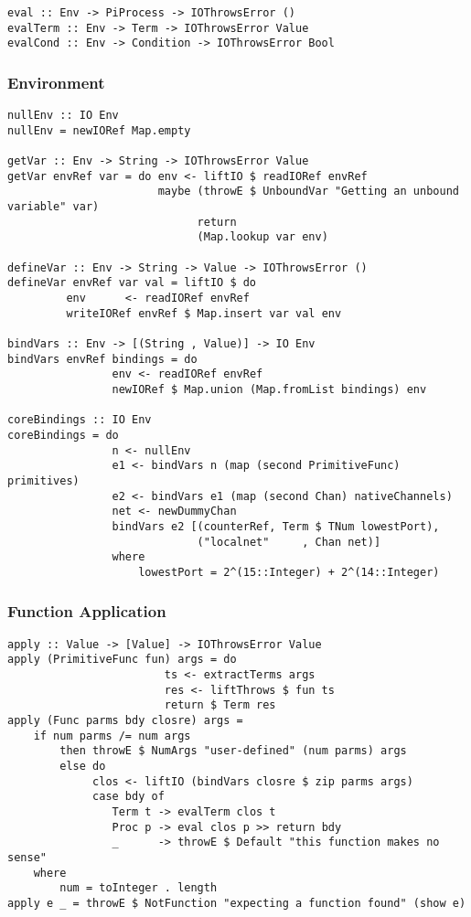 \begin{verbatim}
eval :: Env -> PiProcess -> IOThrowsError () 
evalTerm :: Env -> Term -> IOThrowsError Value
evalCond :: Env -> Condition -> IOThrowsError Bool
\end{verbatim}

\subsubsection{Environment}

\begin{verbatim}
nullEnv :: IO Env
nullEnv = newIORef Map.empty

getVar :: Env -> String -> IOThrowsError Value 
getVar envRef var = do env <- liftIO $ readIORef envRef
                       maybe (throwE $ UnboundVar "Getting an unbound variable" var)
                             return
                             (Map.lookup var env)
                           
defineVar :: Env -> String -> Value -> IOThrowsError ()
defineVar envRef var val = liftIO $ do
         env      <- readIORef envRef
         writeIORef envRef $ Map.insert var val env

bindVars :: Env -> [(String , Value)] -> IO Env
bindVars envRef bindings = do
                env <- readIORef envRef
                newIORef $ Map.union (Map.fromList bindings) env

coreBindings :: IO Env
coreBindings = do
                n <- nullEnv 
                e1 <- bindVars n (map (second PrimitiveFunc) primitives) 
                e2 <- bindVars e1 (map (second Chan) nativeChannels)
                net <- newDummyChan
                bindVars e2 [(counterRef, Term $ TNum lowestPort),
                             ("localnet"     , Chan net)]
                where 
                    lowestPort = 2^(15::Integer) + 2^(14::Integer)
\end{verbatim}


\subsubsection{Function Application}

\begin{verbatim}
apply :: Value -> [Value] -> IOThrowsError Value 
apply (PrimitiveFunc fun) args = do
                        ts <- extractTerms args
                        res <- liftThrows $ fun ts
                        return $ Term res
apply (Func parms bdy closre) args =
    if num parms /= num args 
        then throwE $ NumArgs "user-defined" (num parms) args
        else do
             clos <- liftIO (bindVars closre $ zip parms args)
             case bdy of
                Term t -> evalTerm clos t
                Proc p -> eval clos p >> return bdy
                _      -> throwE $ Default "this function makes no sense"
    where
        num = toInteger . length
apply e _ = throwE $ NotFunction "expecting a function found" (show e)
\end{verbatim}

